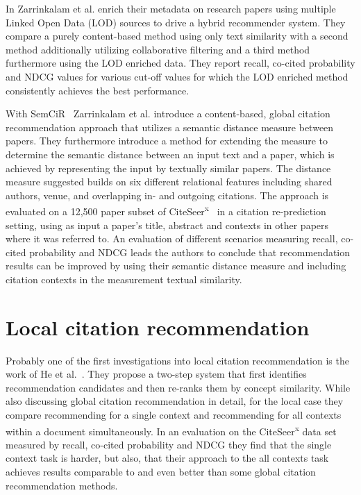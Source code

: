 In \cite{Zarrinkalam2012} Zarrinkalam et al. enrich their metadata on research papers using multiple Linked Open Data (LOD) sources to drive a hybrid recommender system. They compare a purely content-based method using only text similarity with a second method additionally utilizing collaborative filtering and a third method furthermore using the LOD enriched data. They report recall, co-cited probability and NDCG values for various cut-off values for which the LOD enriched method consistently achieves the best performance.

With SemCiR~\cite{Zarrinkalam2013} Zarrinkalam et al. introduce a content-based, global citation recommendation approach that utilizes a semantic distance measure between papers. They furthermore introduce a method for extending the measure to determine the semantic distance between an input text and a paper, which is achieved by representing the input by textually similar papers. The distance measure suggested builds on six different relational features including shared authors, venue, and overlapping in- and outgoing citations. The approach is evaluated on a 12,500 paper subset of CiteSeer\textsuperscript{x}~\cite{Caragea2014} in a citation re-prediction setting, using as input a paper's title, abstract and contexts in other papers where it was referred to. An evaluation of different scenarios measuring recall, co-cited probability and NDCG leads the authors to conclude that recommendation results can be improved by using their semantic distance measure and including citation contexts in the measurement textual similarity.





\section{Local citation recommendation}

Probably one of the first investigations into local citation recommendation is the work of He et al.~\cite{He2010}. They propose a two-step system that first identifies recommendation candidates and then re-ranks them by concept similarity. While also discussing global citation recommendation in detail, for the local case they compare recommending for a single context and recommending for all contexts within a document simultaneously. In an evaluation on the CiteSeer\textsuperscript{x} data set measured by recall, co-cited probability and NDCG they find that the single context task is harder, but also, that their approach to the all contexts task achieves results comparable to and even better than some global citation recommendation methods.


